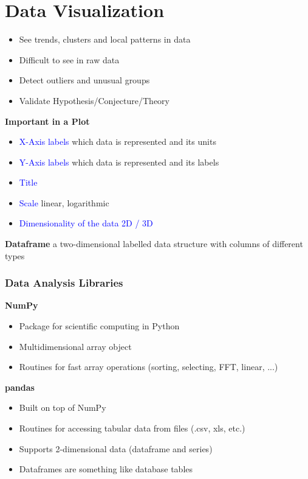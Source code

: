 \section{Data Visualization}
\begin{itemize}
    \item See trends, clusters and local patterns in data
    \item Difficult to see in raw data
    \item Detect outliers and unusual groups
    \item Validate Hypothesis/Conjecture/Theory
\end{itemize}
\textbf{Important in a Plot}
\begin{itemize}
    \item \textcolor{blue}{X-Axis labels} which data is represented and its units
    \item \textcolor{blue}{Y-Axis labels} which data is represented and its labels
    \item \textcolor{blue}{Title}
    \item \textcolor{blue}{Scale} linear, logarithmic
    \item \textcolor{blue}{Dimensionality of the data 2D / 3D}
\end{itemize}
\textbf{Dataframe}
a two-dimensional labelled data structure with columns of different types

\subsubsection{Data Analysis Libraries}
\textbf{NumPy}
\begin{itemize}
    \item Package for scientific computing in Python
    \item Multidimensional array object
    \item Routines for fast array operations (sorting, selecting, FFT, linear, ...)
\end{itemize}

\textbf{pandas}
\begin{itemize}
    \item Built on top of NumPy
    \item Routines for accessing tabular data from files (.csv, xls, etc.)
    \item Supports 2-dimensional data (dataframe and series)
    \item Dataframes are something like database tables
\end{itemize}

